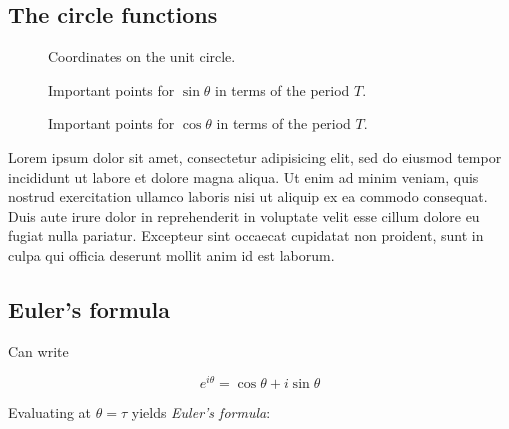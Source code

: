\documentclass{article}
\begin{document}
  \subsection{The circle functions} %
  \label{sec:the_circle_functions}


\begin{figure}
\begin{center}
\end{center}
\caption{Coordinates on the unit circle.\label{fig:sine-with-tau}}
\end{figure}


\begin{figure}
\begin{center}
\end{center}
\caption{Important points for $\sin\theta$ in terms of the period $T$.\label{fig:sine-with-tau}}
\end{figure}

\begin{figure}
\begin{center}
\end{center}
\caption{Important points for $\cos\theta$ in terms of the period $T$.\label{fig:cosine-with-tau}}
\end{figure}


Lorem ipsum dolor sit amet, consectetur adipisicing elit, sed do eiusmod tempor incididunt ut labore et dolore magna aliqua. Ut enim ad minim veniam, quis nostrud exercitation ullamco laboris nisi ut aliquip ex ea commodo consequat. Duis aute irure dolor in reprehenderit in voluptate velit esse cillum dolore eu fugiat nulla pariatur. Excepteur sint occaecat cupidatat non proident, sunt in culpa qui officia deserunt mollit anim id est laborum.
  


   \subsection{Euler's formula} %
   \label{sec:euler_s_formula}
   

Can write

\[ e^{i\theta} = \cos\theta + i\sin\theta \]

Evaluating at $\theta = \tau$ yields \emph{Euler's formula}:
\end{document}
